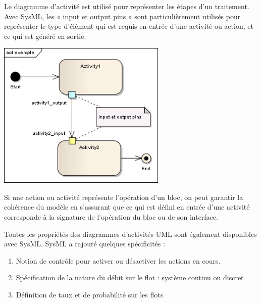 \documentclass[12pt,a4paper]{report}
\begin{document}
\begin{flushleft}
	Le diagramme d'activit\'{e} est utilis\'{e} pour repr\'{e}senter les \'{e}tapes d'un traitement. Avec SysML, les « input et output pins » sont particuli\`{e}rement utilis\'{e}s pour repr\'{e}senter le type d'\'{e}l\'{e}ment qui est requis en entr\'{e}e d'une activit\'{e} ou action, et ce qui est g\'{e}n\'{e}r\'{e} en sortie.
	
	\noindent 
	\noindent \begin{center}
		\includegraphics*[bb=0 0 3.18in 2.78in, width=3.18in, height=2.78in, keepaspectratio=false]{image23}
		
	\end{center}
	
	Si une action ou activit\'{e} repr\'{e}sente l'op\'{e}ration d'un bloc, on peut garantir la coh\'{e}rence du mod\`{e}le en s'assurant que ce qui est d\'{e}fini en entr\'{e}e d'une activit\'{e} corresponde \`{a} la signature de l'op\'{e}ration du bloc ou de son interface.
	
	\noindent Toutes les propri\'{e}t\'{e}s des diagrammes d'activit\'{e}s UML sont \'{e}galement disponibles avec SysML. SysML a rajout\'{e} quelques sp\'{e}cificit\'{e}s :
\end{flushleft}

\begin{enumerate}
	\item  Notion de contr\^{o}le pour activer ou d\'{e}sactiver les actions en cours.
	
	\item  Sp\'{e}cification de la nature du d\'{e}bit sur le flot : syst\`{e}me continu ou discret
	
	\item  D\'{e}finition de taux et de probabilit\'{e} sur les flots
\end{enumerate}
\end{document}
